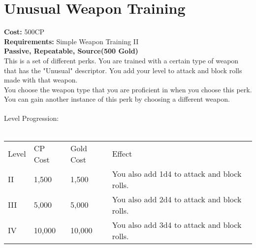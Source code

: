 \section{Unusual Weapon Training}\label{perk:unusualWeaponTraining}
\textbf{Cost:} 500CP\\
\textbf{Requirements:} Simple Weapon Training II\\
\textbf{Passive, Repeatable, Source(500 Gold)}\\
This is a set of different perks.
You are trained with a certain type of weapon that has the "Unusual" descriptor.
You add your level to attack and block rolls made with that weapon.\\
You choose the weapon type that you are proficient in when you choose this perk.
You can gain another instance of this perk by choosing a different weapon.\\
\\
Level Progression:\\
\\
\begin{tabular}{l | l | l | l}
	Level & CP Cost & Gold Cost & Effect\\
	II & 1,500 & 1,500 & You also add 1d4 to attack and block rolls.\\
	III & 5,000 & 5,000 & You also add 2d4 to attack and block rolls.\\
	IV & 10,000 & 10,000 & You also add 3d4 to attack and block rolls.\\
\end{tabular}